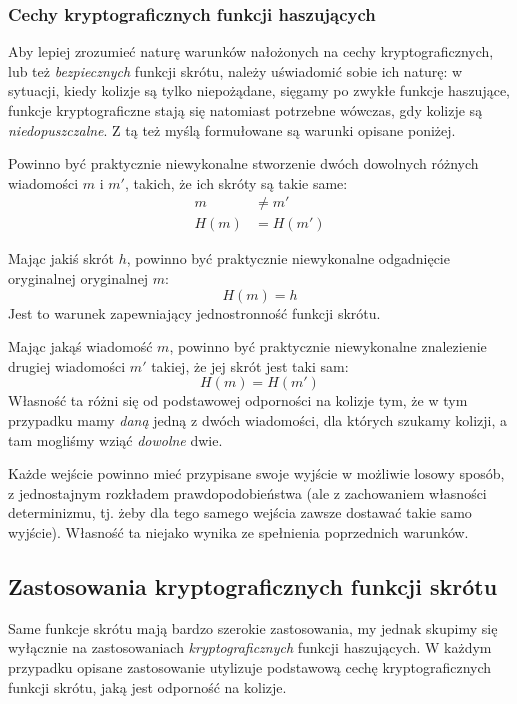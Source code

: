 \documentclass[12pt,a4paper,twoside]{article}
\begin{document}
\subsubsection{Cechy kryptograficznych funkcji haszujących}
\label{sec:secure_hash_attributes}
Aby lepiej zrozumieć naturę warunków nałożonych na cechy kryptograficznych, lub
też \emph{bezpiecznych} funkcji skrótu, należy uświadomić sobie ich naturę: w
sytuacji, kiedy kolizje są tylko niepożądane, sięgamy po zwykłe funkcje
haszujące, funkcje kryptograficzne stają się natomiast potrzebne wówczas, gdy
kolizje są \emph{niedopuszczalne}. Z tą też myślą formułowane są warunki
opisane poniżej.

\label{sec:collision_resistance}
Powinno być praktycznie niewykonalne stworzenie dwóch dowolnych różnych
wiadomości $m$ i $m'$, takich, że ich skróty są takie same:
\[
    \begin{aligned}
    m &\neq m' \\
    H(m) &= H(m')
    \end{aligned}
\]

\label{sec:preimage_resistance}
Mając jakiś skrót $h$, powinno być praktycznie niewykonalne odgadnięcie
oryginalnej oryginalnej $m$:
\[
    H(m) = h
\]
Jest to warunek zapewniający jednostronność funkcji skrótu.

\label{sec:second_preimage_resistance}
Mając jakąś wiadomość $m$, powinno być praktycznie niewykonalne znalezienie
drugiej wiadomości $m'$ takiej, że jej skrót jest taki sam:
\[
    H(m) = H(m')
\]
Własność ta różni się od podstawowej odporności na kolizje tym, że w tym
przypadku mamy \emph{daną} jedną z dwóch wiadomości, dla których szukamy
kolizji, a tam mogliśmy wziąć \emph{dowolne} dwie.

Każde wejście powinno mieć przypisane swoje wyjście w możliwie losowy sposób, z
jednostajnym rozkładem prawdopodobieństwa (ale z zachowaniem własności
determinizmu, tj. żeby dla tego samego wejścia zawsze dostawać takie samo
wyjście). Własność ta niejako wynika ze spełnienia poprzednich warunków.

\label{sec:avalance_effect}



\subsection{Zastosowania kryptograficznych funkcji skrótu}
\label{sec:secure_hash_usages}
Same funkcje skrótu mają bardzo szerokie zastosowania, my jednak skupimy się
wyłącznie na zastosowaniach \emph{kryptograficznych} funkcji haszujących. W
każdym przypadku opisane zastosowanie utylizuje podstawową cechę
kryptograficznych funkcji skrótu, jaką jest odporność na kolizje.
\end{document}
